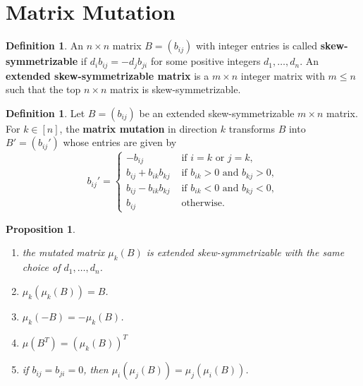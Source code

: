 \documentclass[]{pcmi}
\theoremstyle{plain}
\newtheorem{Proposition}[equation]{Proposition}
\theoremstyle{definition}
\newtheorem{Definition}[equation]{Definition}
\begin{document}
\section{Matrix Mutation}

\begin{Definition}
    An $n \times n$ matrix $B = (b_{ij})$ with integer entries is called \textbf{skew-symmetrizable} if $d_i b_{ij} = -d_j b_{ji}$ for some positive integers $d_1, \ldots, d_n$. An \textbf{extended skew-symmetrizable matrix} is a $m \times n$ integer matrix with $m \leq n$ such that the top $n \times n$ matrix is skew-symmetrizable. 
\end{Definition}

\begin{Definition}
    Let $B = (b_{ij})$ be an extended skew-symmetrizable $m \times n$ matrix. For $k \in [n]$, the \textbf{matrix mutation} in direction $k$ transforms $B$ into $B' = (b_{ij}')$ whose entries are given by 
    \begin{equation}
        b_{ij}' = 
        \begin{cases}
             -b_{ij} & \text{ if } i = k \text{ or } j = k, \\
            b_{ij} + b_{ik} b_{kj} & \text{ if } b_{ik} > 0 \text{ and } b_{kj} > 0, \\
            b_{ij} - b_{ik} b_{kj} & \text{ if } b_{ik} < 0 \text{ and } b_{kj} < 0, \\
             b_{ij} & \text{ otherwise}. 
        \end{cases}
    \end{equation}
\end{Definition}

\begin{Proposition}\label{prop: Properties of Matrix Mutation}
    \phantom{h}
    \begin{enumerate}[label = (\alph*)]
        \item the mutated matrix $\mu_k(B)$ is extended skew-symmetrizable with the same choice of $d_1, \ldots, d_n$. 
        \item $\mu_k(\mu_k(B)) = B$. 
        \item $\mu_k(-B) = -\mu_k(B)$.
        \item $\mu(B^T) = (\mu_k(B))^T$
        \item if $b_{ij} = b_{ji} = 0$, then $\mu_i(\mu_j(B)) = \mu_j (\mu_i(B))$. 
    \end{enumerate}
\end{Proposition}
\end{document}
